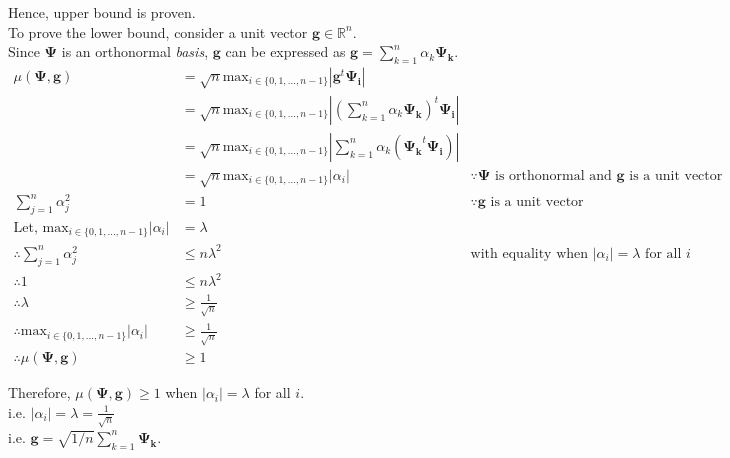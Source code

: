 \documentclass[11pt]{article}
\begin{document}
\begin{enumerate}
Hence, upper bound is proven.\\
To prove the lower bound, consider a unit vector $\mathbf{g} \in \mathbb{R}^n$.\\
Since $\mathbf{\Psi}$ is an orthonormal \emph{basis}, $\mathbf{g}$ can be expressed as $\mathbf{g} = \sum_{k=1}^n \alpha_k \mathbf{\Psi_k}$.\\
\begin{align}
\mu(\mathbf{\Psi},\mathbf{g}) &= \sqrt{n} \textrm{max}_{i \in \{0,1,...,n-1\}} |\mathbf{g}^t \mathbf{\Psi_i}| & \\
&= \sqrt{n} \textrm{max}_{i \in \{0,1,...,n-1\}} |(\sum_{k=1}^n \alpha_k \mathbf{\Psi_k})^t \mathbf{\Psi_i}| & \\
&= \sqrt{n} \textrm{max}_{i \in \{0,1,...,n-1\}} |\sum_{k=1}^n \alpha_k (\mathbf{\Psi_k}^t \mathbf{\Psi_i})| & \\
&= \sqrt{n} \textrm{max}_{i \in \{0,1,...,n-1\}} |\alpha_i| & \because \textrm{$\mathbf{\Psi}$ is orthonormal and $\mathbf{g}$ is a unit vector} \\
\sum_{j=1}^n \alpha^2_j &= 1 & \because \textrm{$\mathbf{g}$ is a unit vector}\\
\textrm{Let, } \textrm{max}_{i \in \{0,1,...,n-1\}} |\alpha_i| &= \lambda \\
\therefore \sum_{j=1}^n \alpha^2_j &\le n\lambda^2 & \textrm{with equality when $|\alpha_i| = \lambda$ for all $i$} \\
\therefore 1 &\le n\lambda^2 \\
\therefore \lambda &\ge \frac{1}{\sqrt{n}} \\
\therefore \textrm{max}_{i \in \{0,1,...,n-1\}} |\alpha_i| &\ge \frac{1}{\sqrt{n}} \\
\therefore \mu(\mathbf{\Psi},\mathbf{g}) &\ge 1
\end{align}

Therefore, $\mu(\mathbf{\Psi},\mathbf{g}) \ge 1$ when $|\alpha_i| = \lambda$ for all $i$.\\
i.e. $|\alpha_i| = \lambda = \frac{1}{\sqrt{n}}$ \\
i.e. $\mathbf{g} = \sqrt{1/n} \sum_{k=1}^n \mathbf{\Psi_k}$.


\end{enumerate}
\end{document}
